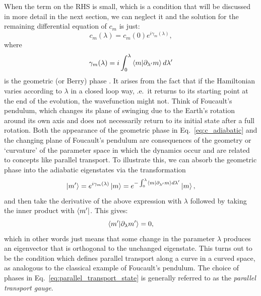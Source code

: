     When the term on the RHS is small, which is a condition that will be discussed in more detail in the next section, we can neglect it and the solution for the remaining differential equation of $c_m$ is just:
    \begin{equation}\label{eq:c_adiabatic}
        c_m(\lambda) = c_m(0)e^{i \gamma_m(\lambda)},
    \end{equation}
    where
    \begin{equation}\label{eq:geometric_phase}
        \gamma_m(\lambda) = i \int_0^{\lambda} \braket{m}{\partial_{\lambda'} m} d \lambda' 
    \end{equation}
    is the geometric (or Berry) phase \cite{pancharatnam_generalized_1956, longuet-higgins_studies_1958, berry_quantal_1984}. It arises from the fact that if the Hamiltonian varies according to $\lambda$ in a closed loop way, \@i.e.~it returns to its starting point at the end of the evolution, the wavefunction might not. Think of Foucault's pendulum, which changes its plane of swinging due to the Earth's rotation around its own axis and does not necessarily return to its initial state after a full rotation. Both the appearance of the geometric phase in Eq.~\eqref{eq:c_adiabatic} and the changing plane of Foucault's pendulum are consequences of the geometry or `curvature' of the parameter space in which the dynamics occur and are related to concepts like parallel transport. To illustrate this, we can absorb the geometric phase into the adiabatic eigenstates via the transformation
    \begin{equation}\label{eq:parallel_transport_state}
        \ket{m'} = e^{i \gamma_m(\lambda)}\ket{m} = e^{- \int_0^{\lambda} \braket{m}{\partial_{\lambda'} m} d \lambda'}\ket{m},
    \end{equation}
    and then take the derivative of the above expression with $\lambda$ followed by taking the inner product with $\bra{m'}$. This gives:
    \begin{equation}\label{eq:geometric_phase_cancellation}
        \braket{m'}{\partial_{\lambda} m'} = 0,
    \end{equation}
    which in other words just means that some change in the parameter $\lambda$ produces an eigenvector that is orthogonal to the unchanged eigenstate. This turns out to be the condition which defines parallel transport along a curve in a curved space, as analogous to the classical example of Foucault's pendulum. The choice of phases in Eq.~\eqref{eq:parallel_transport_state} is generally referred to as the \emph{parallel transport gauge}\cite{nakahara_geometry_2003}.
    
